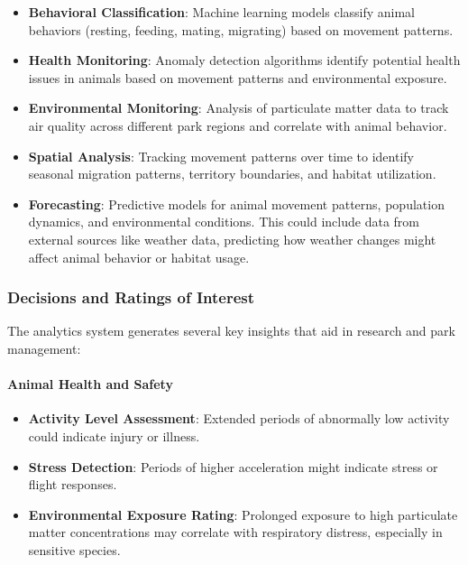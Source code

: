 \begin{itemize}
  \item \textbf{Behavioral Classification}: Machine learning models classify animal behaviors (resting, feeding, mating, migrating) based on movement patterns.
  \item \textbf{Health Monitoring}: Anomaly detection algorithms identify potential health issues in animals based on movement patterns and environmental exposure. %
  \item \textbf{Environmental Monitoring}: Analysis of particulate matter data to track air quality across different park regions and correlate with animal behavior.
  \item \textbf{Spatial Analysis}: Tracking movement patterns over time to identify seasonal migration patterns, territory boundaries, and habitat utilization.
  \item \textbf{Forecasting}: Predictive models for animal movement patterns, population dynamics, and environmental conditions. This could include data from external sources like weather data, predicting how weather changes might affect animal behavior or habitat usage.
\end{itemize}

\subsubsection{Decisions and Ratings of Interest}

The analytics system generates several key insights that aid in research and park management:

\paragraph{Animal Health and Safety}
\begin{itemize}
  \item \textbf{Activity Level Assessment}: Extended periods of abnormally low activity could indicate injury or illness.
  \item \textbf{Stress Detection}: Periods of higher acceleration might indicate stress or flight responses.
  \item \textbf{Environmental Exposure Rating}: Prolonged exposure to high particulate matter concentrations may correlate with respiratory distress, especially in sensitive species.
\end{itemize}

